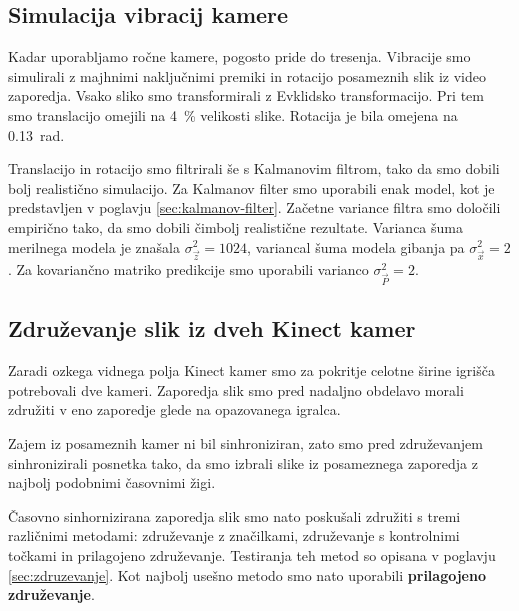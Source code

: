 \subsection{Simulacija vibracij kamere}
Kadar uporabljamo ročne kamere, pogosto pride do tresenja. Vibracije smo simulirali z majhnimi naključnimi premiki in rotacijo posameznih slik iz video zaporedja. Vsako sliko smo transformirali z Evklidsko transformacijo. Pri tem smo translacijo omejili na \SI{4}{\%} velikosti slike. Rotacija je bila omejena na \SI{0.13}{rad}. 

Translacijo in rotacijo smo filtrirali še s Kalmanovim filtrom, tako da smo dobili bolj realistično simulacijo. Za Kalmanov filter smo uporabili enak model, kot je predstavljen v poglavju \ref{sec:kalmanov-filter}. Začetne variance filtra smo določili empirično tako, da smo dobili čimbolj realistične rezultate. Varianca šuma merilnega modela je znašala $\sigma_\vec{z}^2=1024$, variancal šuma modela gibanja pa $\sigma_\vec{x}^2=2$. Za kovariančno matriko predikcije smo uporabili varianco $\sigma_\vec{P}^2=2$.


\subsection{Združevanje slik iz dveh Kinect kamer}
Zaradi ozkega vidnega polja Kinect kamer smo za pokritje celotne širine igrišča potrebovali dve kameri. Zaporedja slik smo pred nadaljno obdelavo morali združiti v eno zaporedje glede na opazovanega igralca.

Zajem iz posameznih kamer ni bil sinhroniziran, zato smo pred združevanjem sinhronizirali posnetka tako, da smo izbrali slike iz posameznega zaporedja z najbolj podobnimi časovnimi žigi.

Časovno sinhornizirana zaporedja slik smo nato poskušali združiti s tremi različnimi metodami:  združevanje z značilkami, združevanje s kontrolnimi točkami in prilagojeno združevanje. Testiranja teh metod so opisana v poglavju \ref{sec:zdruzevanje}. Kot najbolj usešno metodo smo nato uporabili \textbf{prilagojeno združevanje}.

